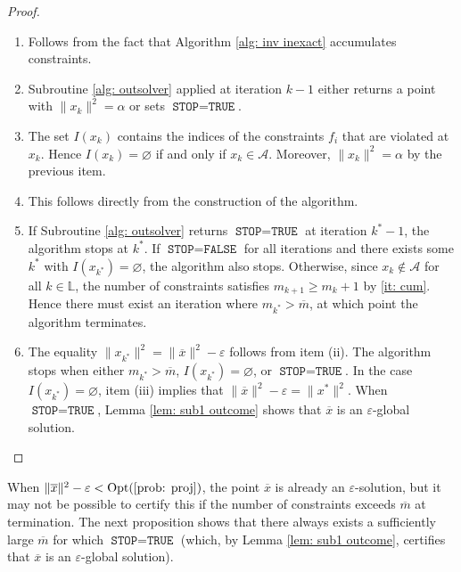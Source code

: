 \documentclass[12pt]{amsart}
\theoremstyle{plain}
\theoremstyle{definition}
\begin{document}
\begin{proof}
\begin{enumerate}
    \item Follows from the fact that Algorithm \ref{alg: inv inexact} accumulates constraints.
    \item Subroutine \ref{alg: outsolver} applied at iteration \(k-1\) either returns a point with \(\|x_k\|^2 = \alpha\) or sets \(\texttt{STOP} = \texttt{TRUE}\).
    \item The set \(I(x_k)\) contains the indices of the constraints \(f_i\) that are violated at \(x_k\). Hence \(I(x_k) = \varnothing\) if and only if \(x_k \in \mathcal{A}\). Moreover, \(\|x_k\|^2 = \alpha\) by the previous item.
    \item This follows directly from the construction of the algorithm.
    \item If Subroutine \ref{alg: outsolver} returns \(\texttt{STOP} = \texttt{TRUE}\) at iteration \(k^*-1\), the algorithm stops at \(k^*\). If \(\texttt{STOP} = \texttt{FALSE}\) for all iterations and there exists some \(k^*\) with \(I(x_{k^*}) = \varnothing\), the algorithm also stops. Otherwise, since \(x_k \notin \mathcal{A}\) for all \(k \in \mathbb{L}\), the number of constraints satisfies \(m_{k+1} \ge m_k + 1\) by \eqref{it: cum}. Hence there must exist an iteration where \(m_{k^*} > \overline{m}\), at which point the algorithm terminates.
    \item The equality \(\|x_{k^*}\|^2 = \|\overline{x}\|^2 - \varepsilon\) follows from item (ii). The algorithm stops when either \(m_{k^*} > \overline{m}\), \(I(x_{k^*}) = \varnothing\), or \(\texttt{STOP} = \texttt{TRUE}\). In the case \(I(x_{k^*}) = \varnothing\), item (iii) implies that \(\|\overline{x}\|^2 - \varepsilon = \|x^*\|^2\). When \(\texttt{STOP} = \texttt{TRUE}\), Lemma \ref{lem: sub1 outcome} shows that \(\overline{x}\) is an \(\varepsilon\)-global solution.
\end{enumerate}
\end{proof}

When \(\|\overline{x}\|^2 - \varepsilon < \operatorname{Opt}(\eqref{prob: proj})\), the point \(\overline{x}\) is already an \(\varepsilon\)-solution, but it may not be possible to certify this if the number of constraints exceeds \(\overline{m}\) at termination. The next proposition shows that there always exists a sufficiently large \(\overline{m}\) for which \(\texttt{STOP} = \texttt{TRUE}\) (which, by Lemma \ref{lem: sub1 outcome}, certifies that \(\overline{x}\) is an \(\varepsilon\)-global solution).
\end{document}
